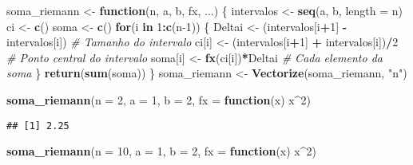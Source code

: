\documentclass[
]{article}
\newenvironment{Shaded}{\begin{snugshade}}{\end{snugshade}}
\newcommand{\AttributeTok}[1]{\textcolor[rgb]{0.13,0.29,0.53}{#1}}
\newcommand{\CommentTok}[1]{\textcolor[rgb]{0.56,0.35,0.01}{\textit{#1}}}
\newcommand{\ControlFlowTok}[1]{\textcolor[rgb]{0.13,0.29,0.53}{\textbf{#1}}}
\newcommand{\DecValTok}[1]{\textcolor[rgb]{0.00,0.00,0.81}{#1}}
\newcommand{\FunctionTok}[1]{\textcolor[rgb]{0.13,0.29,0.53}{\textbf{#1}}}
\newcommand{\NormalTok}[1]{#1}
\newcommand{\OtherTok}[1]{\textcolor[rgb]{0.56,0.35,0.01}{#1}}
\newcommand{\SpecialCharTok}[1]{\textcolor[rgb]{0.81,0.36,0.00}{\textbf{#1}}}
\newcommand{\StringTok}[1]{\textcolor[rgb]{0.31,0.60,0.02}{#1}}
\begin{document}
\begin{Shaded}
\begin{Highlighting}[]
\NormalTok{soma\_riemann }\OtherTok{\textless{}{-}} \ControlFlowTok{function}\NormalTok{(n, a, b, fx, ...) \{}
\NormalTok{  intervalos }\OtherTok{\textless{}{-}} \FunctionTok{seq}\NormalTok{(a, b, }\AttributeTok{length =}\NormalTok{ n)}
\NormalTok{  ci }\OtherTok{\textless{}{-}} \FunctionTok{c}\NormalTok{()}
\NormalTok{  soma }\OtherTok{\textless{}{-}} \FunctionTok{c}\NormalTok{()}
  \ControlFlowTok{for}\NormalTok{(i }\ControlFlowTok{in} \DecValTok{1}\SpecialCharTok{:}\FunctionTok{c}\NormalTok{(n}\DecValTok{{-}1}\NormalTok{)) \{}
\NormalTok{    Deltai }\OtherTok{\textless{}{-}}\NormalTok{ (intervalos[i}\SpecialCharTok{+}\DecValTok{1}\NormalTok{] }\SpecialCharTok{{-}}\NormalTok{ intervalos[i]) }\CommentTok{\# Tamanho do intervalo}
\NormalTok{    ci[i] }\OtherTok{\textless{}{-}}\NormalTok{ (intervalos[i}\SpecialCharTok{+}\DecValTok{1}\NormalTok{] }\SpecialCharTok{+}\NormalTok{ intervalos[i])}\SpecialCharTok{/}\DecValTok{2} \CommentTok{\# Ponto central do intervalo}
\NormalTok{    soma[i] }\OtherTok{\textless{}{-}} \FunctionTok{fx}\NormalTok{(ci[i])}\SpecialCharTok{*}\NormalTok{Deltai }\CommentTok{\# Cada elemento da soma}
\NormalTok{  \}}
  \FunctionTok{return}\NormalTok{(}\FunctionTok{sum}\NormalTok{(soma))}
\NormalTok{\}}
\NormalTok{soma\_riemann }\OtherTok{\textless{}{-}} \FunctionTok{Vectorize}\NormalTok{(soma\_riemann, }\StringTok{"n"}\NormalTok{)}

\FunctionTok{soma\_riemann}\NormalTok{(}\AttributeTok{n =} \DecValTok{2}\NormalTok{, }\AttributeTok{a =} \DecValTok{1}\NormalTok{, }\AttributeTok{b =} \DecValTok{2}\NormalTok{, }\AttributeTok{fx =} \ControlFlowTok{function}\NormalTok{(x) x}\SpecialCharTok{\^{}}\DecValTok{2}\NormalTok{)}
\end{Highlighting}
\end{Shaded}

\begin{verbatim}
## [1] 2.25
\end{verbatim}

\begin{Shaded}
\begin{Highlighting}[]
\FunctionTok{soma\_riemann}\NormalTok{(}\AttributeTok{n =} \DecValTok{10}\NormalTok{, }\AttributeTok{a =} \DecValTok{1}\NormalTok{, }\AttributeTok{b =} \DecValTok{2}\NormalTok{, }\AttributeTok{fx =} \ControlFlowTok{function}\NormalTok{(x) x}\SpecialCharTok{\^{}}\DecValTok{2}\NormalTok{)}
\end{Highlighting}
\end{Shaded}
\end{document}
